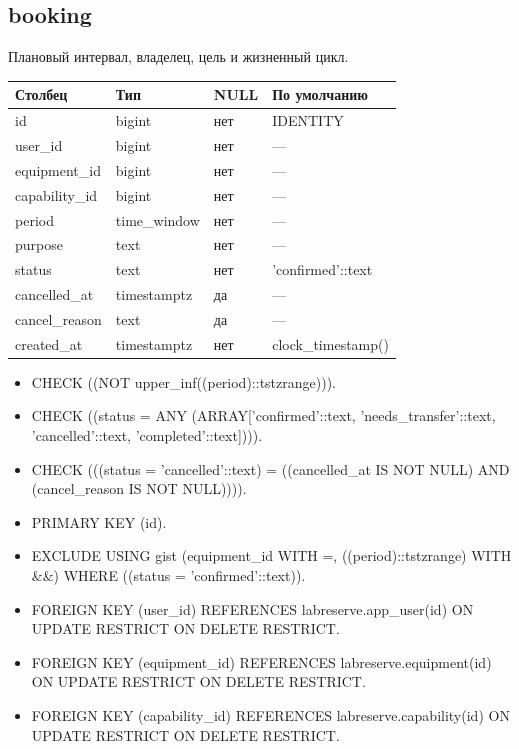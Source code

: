 \par\noindent\begin{minipage}{\linewidth}
\subsection{booking}
Плановый интервал, владелец, цель и жизненный цикл.\par\smallskip\noindent
\begin{tabular}{p{}p{}p{}p{}}
\toprule Столбец & Тип & NULL & По умолчанию \\ \midrule
id & bigint & нет & IDENTITY \\
user\_\allowbreak{}id & bigint & нет & — \\
equipment\_\allowbreak{}id & bigint & нет & — \\
capability\_\allowbreak{}id & bigint & нет & — \\
period & time\_\allowbreak{}window & нет & — \\
purpose & text & нет & — \\
status & text & нет & 'confirmed'::text \\
cancelled\_\allowbreak{}at & timestamptz & да & — \\
cancel\_\allowbreak{}reason & text & да & — \\
created\_\allowbreak{}at & timestamptz & нет & clock\_\allowbreak{}timestamp() \\
\bottomrule\end{tabular}\end{minipage}\par
\begin{itemize}
\item CHECK ((NOT upper\_\allowbreak{}inf((period)::tstzrange))).
\item CHECK ((status = ANY (ARRAY['confirmed'::text, 'needs\_\allowbreak{}transfer'::text, 'cancelled'::text, 'completed'::text]))).
\item CHECK (((status = 'cancelled'::text) = ((cancelled\_\allowbreak{}at IS NOT NULL) AND (cancel\_\allowbreak{}reason IS NOT NULL)))).
\item PRIMARY KEY (id).
\item EXCLUDE USING gist (equipment\_\allowbreak{}id WITH =, ((period)::tstzrange) WITH \&\&) WHERE ((status = 'confirmed'::text)).
\item FOREIGN KEY (user\_\allowbreak{}id) REFERENCES labreserve.app\_\allowbreak{}user(id) ON UPDATE RESTRICT ON DELETE RESTRICT.
\item FOREIGN KEY (equipment\_\allowbreak{}id) REFERENCES labreserve.equipment(id) ON UPDATE RESTRICT ON DELETE RESTRICT.
\item FOREIGN KEY (capability\_\allowbreak{}id) REFERENCES labreserve.capability(id) ON UPDATE RESTRICT ON DELETE RESTRICT.
\end{itemize}
